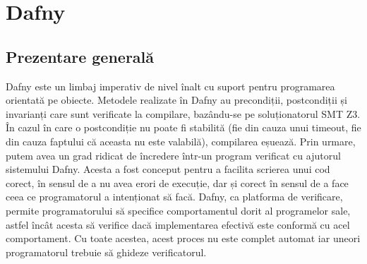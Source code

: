 \chapter{Dafny}
\section{Prezentare generală}

Dafny este un limbaj imperativ de nivel înalt cu suport pentru programarea orientată pe obiecte. Metodele realizate în Dafny
au precondiții, postcondiții și invarianți care sunt verificate la compilare, bazându-se pe soluționatorul SMT Z3. În cazul în care o postcondiție nu poate fi stabilită (fie din cauza unui timeout, fie din cauza faptului că aceasta nu este valabilă), compilarea eșuează. Prin urmare, putem avea un grad ridicat de încredere într-un program verificat cu ajutorul sistemului Dafny.
Acesta a fost conceput pentru a facilita scrierea unui cod corect, în sensul de a nu avea erori de execuție, dar și corect în sensul de a face ceea ce programatorul a intenționat să facă.\cite{DBLP:journals/corr/abs-1909-01743}
Dafny, ca platforma de verificare,  permite programatorului să specifice comportamentul dorit al programelor sale, astfel încât acesta să verifice dacă implementarea efectivă este conformă cu acel comportament. Cu toate acestea, acest proces nu este complet automat iar uneori programatorul trebuie să ghideze verificatorul.\cite{DBLP:journals/jlap/BlazquezMS23}
